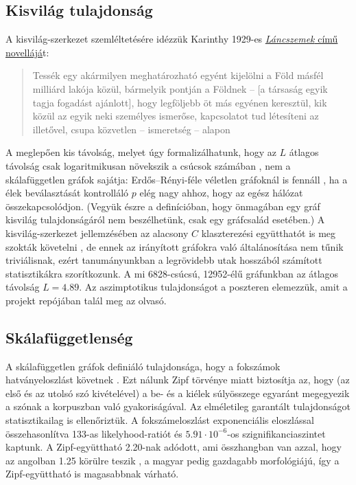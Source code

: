 \documentclass{llncs}
\begin{document}
\subsection{Kisvilág tulajdonság}

A kisvilág-szerkezet szemléltetésére idézzük Karinthy 1929-es
\href{http://www.irodalmijelen.hu/05242013-1547/karinthy-frigyes-lancszemek}{\emph{Láncszemek}
című novellájá}t:

\begin{quote}
  Tessék egy akármilyen meghatározható egyént kijelölni a Föld másfél milliárd
  lakója közül, bármelyik pontján a Földnek – [a társaság egyik tagja fogadást
  ajánlott], hogy legföljebb öt más egyénen keresztül, kik közül az egyik neki
  személyes ismerőse, kapcsolatot tud létesíteni az illetővel, csupa közvetlen
  – ismeretség – alapon
\end{quote}

A meglepően kis távolság, melyet úgy formalizálhatunk, hogy az $L$ átlagos
távolság csak logaritmikusan növekszik a csúcsok számában , nem a
skálafüggetlen gráfok sajátja: Erdős--Rényi-féle véletlen gráfoknál is fennáll
\cite{erdos1960evolution}, ha a élek beválasztását kontrolláló $p$ elég nagy
ahhoz, hogy az egész hálózat összekapcsolódjon. (Vegyük észre a definícióban,
hogy önmagában egy gráf kisvilág tulajdonságáról nem beszélhetünk, csak egy
gráfcsalád esetében.) A kisvilág-szerkezet jellemzésében az alacsony $C$
klaszterezési együtthatót is meg szokták követelni \cite{watts1998collective},
de ennek az irányított gráfokra való általánosítása nem tűnik triviálisnak,
ezért tanumányunkban  a legrövidebb utak hosszából számított statisztikákra
szorítkozunk.  A mi 6828-csúcsú, 12952-élű gráfunkban az átlagos távolság
$L=4.89$. Az aszimptotikus tulajdonságot a poszteren elemezzük, amit a projekt
repójában talál meg az olvasó.

\subsection{Skálafüggetlenség}

A skálafüggetlen gráfok definiáló tulajdonsága, hogy a fokszámok
hatványeloszlást követnek \cite{barabasi1999emergence}. Ezt nálunk Zipf
törvénye miatt biztosítja az, hogy (az első és az utolsó szó kivételével) a be-
és a kiélek súlyösszege egyaránt megegyezik a szónak a korpuszban való
gyakoriságával.  Az elméletileg garantált tulajdonságot statisztikailag is
ellenőriztük.  A fokszámeloszlást exponenciális eloszlással összehasonlítva
133-as likelyhood-ratiót és $5.91\cdot 10^{-6}$-os szignifikanciaszintet
kaptunk. A Zipf-együttható 2.20-nak adódott, ami összhangban van azzal, hogy az
angolban 1.25 körülre teszik \cite{Kornai:2008}, a magyar pedig gazdagabb
morfológiájú, így a Zipf-együttható is magasabbnak várható.
\end{document}
